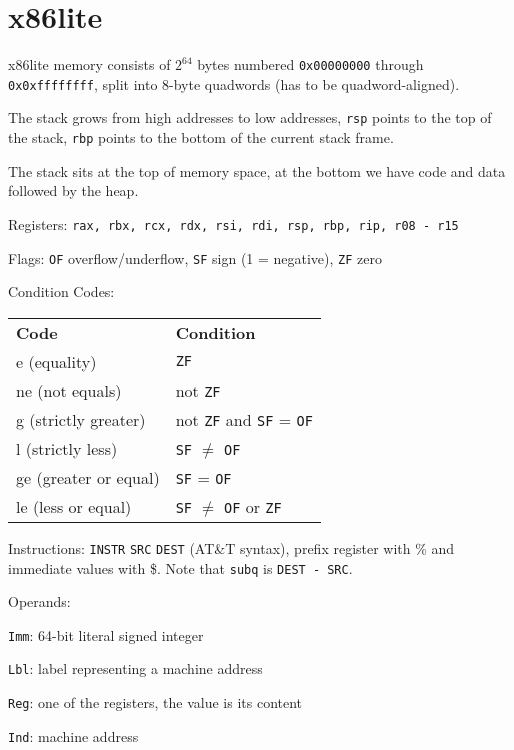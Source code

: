 \section*{x86lite}

x86lite memory consists of $2^{64}$ bytes numbered \texttt{0x00000000} through \texttt{0x0xffffffff}, split into 8-byte quadwords (has to be quadword-aligned). \medskip
	
The stack grows from high addresses to low addresses, \texttt{rsp} points to the top of the stack, \texttt{rbp} points to the bottom of the current stack frame. \medskip

The stack sits at the top of memory space, at the bottom we have code and data followed by the heap.\medskip
	
Registers: \texttt{rax, rbx, rcx, rdx, rsi, rdi, rsp, rbp, rip, r08 - r15} \medskip
	
Flags: \texttt{OF} overflow/underflow, \texttt{SF} sign (1 = negative), \texttt{ZF} zero \medskip

Condition Codes:
\begin{center}
	\begin{tabular}{l l}
		 \textbf{Code} & \textbf{Condition} \\
		 e (equality) & \texttt{ZF} \\
		 ne (not equals) & not \texttt{ZF} \\
		 g (strictly greater) & not \texttt{ZF} and \texttt{SF} = \texttt{OF} \\
		 l (strictly less) & \texttt{SF} $\neq$ \texttt{OF} \\
		 ge (greater or equal) & \texttt{SF} = \texttt{OF} \\
		 le (less or equal) & \texttt{SF} $\neq$ \texttt{OF} or \texttt{ZF} \\
	\end{tabular}
\end{center}
	
Instructions: \texttt{INSTR} \texttt{SRC} \texttt{DEST} (AT\&T syntax), prefix register with \% and immediate values with \$. Note that \texttt{subq} is \texttt{DEST - SRC}.\medskip
	
Operands:
\begin{compactitem}
	\item \texttt{Imm}: 64-bit literal signed integer
	\item \texttt{Lbl}: label representing a machine address
	\item \texttt{Reg}: one of the registers, the value is its content
	\item \texttt{Ind}: machine address
\end{compactitem} \medskip

